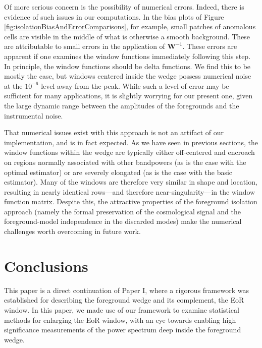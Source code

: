 \documentclass[twocolumn,aps,prd,nofootinbib,showpacs]{revtex4-1}
\begin{document}
Of more serious concern is the possibility of numerical errors.  Indeed, there is evidence of such issues in our computations.  In the bias plots of Figure \ref{fig:isolationBiasAndErrorComparisons}, for example, small patches of anomalous cells are visible in the middle of what is otherwise a smooth background.  These are attributable to small errors in the application of $\mathbf{W}^{-1}$.  These errors are apparent if one examines the window functions immediately following this step.  In principle, the window functions should be delta functions.  We find this to be mostly the case, but windows centered inside the wedge possess numerical noise at the $10^{-6}$ level away from the peak.  While such a level of error may be sufficient for many applications, it is slightly worrying for our present one, given the large dynamic range between the amplitudes of the foregrounds and the instrumental noise.

That numerical issues exist with this approach is not an artifact of our implementation, and is in fact expected.  As we have seen in previous sections, the window functions within the wedge are typically either off-centered and encroach on regions normally associated with other bandpowers (as is the case with the optimal estimator) or are severely elongated (as is the case with the basic estimator).  Many of the windows are therefore very similar in shape and location, resulting in nearly identical rows---and therefore near-singularity---in the window function matrix.  Despite this, the attractive properties of the foreground isolation approach (namely the formal preservation of the cosmological signal and the foreground-model independence in the discarded modes) make the numerical challenges worth overcoming in future work.

\section{Conclusions}
\label{sec:Conclusions}
This paper is a direct continuation of Paper I, where a rigorous framework was established for describing the foreground wedge and its complement, the EoR window.  In this paper, we made use of our framework to examine statistical methods for enlarging the EoR window, with an eye towards enabling high significance measurements of the power spectrum deep inside the foreground wedge.
\end{document}
